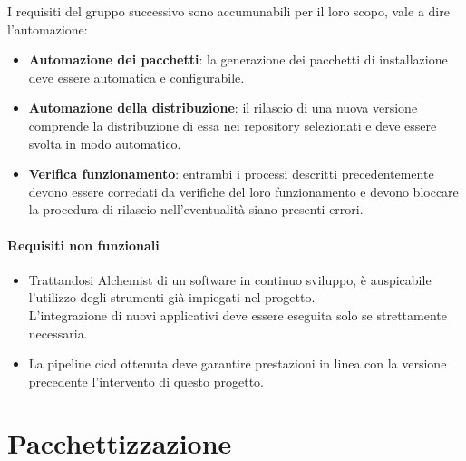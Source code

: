 I requisiti del gruppo successivo sono accumunabili per il loro scopo, vale a dire l'automazione:

\begin{itemize}
	\item \textbf{Automazione dei pacchetti}: la generazione dei pacchetti di installazione deve essere automatica e configurabile.
	\item \textbf{Automazione della distribuzione}: il rilascio di una nuova versione comprende la distribuzione di essa nei repository selezionati e deve essere svolta in modo automatico.
	\item \textbf{Verifica funzionamento}: entrambi i processi descritti precedentemente devono essere corredati da verifiche del loro funzionamento e devono bloccare la procedura di rilascio nell'eventualità siano presenti errori.
\end{itemize}

\paragraph{Requisiti non funzionali}

\begin{itemize}
	\item Trattandosi Alchemist di un software in continuo sviluppo, è auspicabile l'utilizzo degli strumenti già impiegati nel progetto. \\ L'integrazione di nuovi applicativi deve essere eseguita solo se strettamente necessaria.
	\item La pipeline \ac{cicd} ottenuta deve garantire prestazioni in linea con la versione precedente l'intervento di questo progetto.
\end{itemize}

\section{Pacchettizzazione}\label{sec:packaging}

